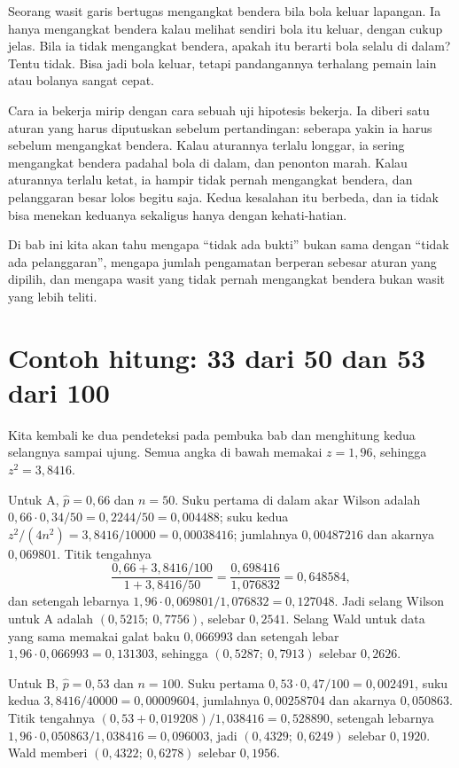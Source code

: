 \begin{untukanak}
Seorang wasit garis bertugas mengangkat bendera bila bola keluar lapangan. Ia hanya
mengangkat bendera kalau melihat sendiri bola itu keluar, dengan cukup jelas. Bila ia
tidak mengangkat bendera, apakah itu berarti bola selalu di dalam? Tentu tidak. Bisa
jadi bola keluar, tetapi pandangannya terhalang pemain lain atau bolanya sangat cepat.

Cara ia bekerja mirip dengan cara sebuah uji hipotesis bekerja. Ia diberi satu aturan
yang harus diputuskan sebelum pertandingan: seberapa yakin ia harus sebelum
mengangkat bendera. Kalau aturannya terlalu longgar, ia sering mengangkat bendera
padahal bola di dalam, dan penonton marah. Kalau aturannya terlalu ketat, ia hampir
tidak pernah mengangkat bendera, dan pelanggaran besar lolos begitu saja. Kedua
kesalahan itu berbeda, dan ia tidak bisa menekan keduanya sekaligus hanya dengan
kehati-hatian.

Di bab ini kita akan tahu mengapa ``tidak ada bukti'' bukan sama dengan ``tidak ada
pelanggaran'', mengapa jumlah pengamatan berperan sebesar aturan yang dipilih, dan
mengapa wasit yang tidak pernah mengangkat bendera bukan wasit yang lebih teliti.
\end{untukanak}

\section{Contoh hitung: 33 dari 50 dan 53 dari 100}

Kita kembali ke dua pendeteksi pada pembuka bab dan menghitung kedua selangnya sampai
ujung. Semua angka di bawah memakai $z=1{,}96$, sehingga $z^2=3{,}8416$.

Untuk A, $\hat p=0{,}66$ dan $n=50$. Suku pertama di dalam akar Wilson adalah
$0{,}66\cdot0{,}34/50=0{,}2244/50=0{,}004488$; suku kedua
$z^2/(4n^2)=3{,}8416/10000=0{,}00038416$; jumlahnya $0{,}00487216$ dan akarnya
$0{,}069801$. Titik tengahnya
\[
\frac{0{,}66+3{,}8416/100}{1+3{,}8416/50}
=\frac{0{,}698416}{1{,}076832}=0{,}648584,
\]
dan setengah lebarnya $1{,}96\cdot0{,}069801/1{,}076832=0{,}127048$. Jadi selang
Wilson untuk A adalah $(0{,}5215;\ 0{,}7756)$, selebar $0{,}2541$. Selang Wald untuk
data yang sama memakai galat baku $0{,}066993$ dan setengah lebar
$1{,}96\cdot0{,}066993=0{,}131303$, sehingga $(0{,}5287;\ 0{,}7913)$ selebar
$0{,}2626$.

Untuk B, $\hat p=0{,}53$ dan $n=100$. Suku pertama
$0{,}53\cdot0{,}47/100=0{,}002491$, suku kedua $3{,}8416/40000=0{,}00009604$,
jumlahnya $0{,}00258704$ dan akarnya $0{,}050863$. Titik tengahnya
$(0{,}53+0{,}019208)/1{,}038416=0{,}528890$, setengah lebarnya
$1{,}96\cdot0{,}050863/1{,}038416=0{,}096003$, jadi $(0{,}4329;\ 0{,}6249)$ selebar
$0{,}1920$. Wald memberi $(0{,}4322;\ 0{,}6278)$ selebar $0{,}1956$.


